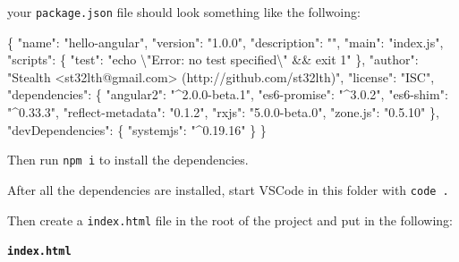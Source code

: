 \documentclass[12pt,]{article}
\newenvironment{Shaded}{}{}
\newcommand{\DataTypeTok}[1]{{#1}}
\newcommand{\CharTok}[1]{\textcolor[rgb]{0.00,0.50,0.50}{{#1}}}
\newcommand{\StringTok}[1]{\textcolor[rgb]{0.00,0.50,0.50}{{#1}}}
\newcommand{\FunctionTok}[1]{{#1}}
\begin{document}
your \texttt{package.json} file should look something like the
follwoing:

\begin{Shaded}
\begin{Highlighting}[numbers=left,,]
\FunctionTok{\{}
  \DataTypeTok{"name"}\FunctionTok{:} \StringTok{"hello-angular"}\FunctionTok{,}
  \DataTypeTok{"version"}\FunctionTok{:} \StringTok{"1.0.0"}\FunctionTok{,}
  \DataTypeTok{"description"}\FunctionTok{:} \StringTok{""}\FunctionTok{,}
  \DataTypeTok{"main"}\FunctionTok{:} \StringTok{"index.js"}\FunctionTok{,}
  \DataTypeTok{"scripts"}\FunctionTok{:} \FunctionTok{\{}
    \DataTypeTok{"test"}\FunctionTok{:} \StringTok{"echo }\CharTok{\textbackslash{}"}\StringTok{Error: no test specified}\CharTok{\textbackslash{}"}\StringTok{ && exit 1"}
  \FunctionTok{\},}
  \DataTypeTok{"author"}\FunctionTok{:} \StringTok{"Stealth <st32lth@gmail.com> (http://github.com/st32lth)"}\FunctionTok{,}
  \DataTypeTok{"license"}\FunctionTok{:} \StringTok{"ISC"}\FunctionTok{,}
  \DataTypeTok{"dependencies"}\FunctionTok{:} \FunctionTok{\{}
    \DataTypeTok{"angular2"}\FunctionTok{:} \StringTok{"^2.0.0-beta.1"}\FunctionTok{,}
    \DataTypeTok{"es6-promise"}\FunctionTok{:} \StringTok{"^3.0.2"}\FunctionTok{,}
    \DataTypeTok{"es6-shim"}\FunctionTok{:} \StringTok{"^0.33.3"}\FunctionTok{,}
    \DataTypeTok{"reflect-metadata"}\FunctionTok{:} \StringTok{"0.1.2"}\FunctionTok{,}
    \DataTypeTok{"rxjs"}\FunctionTok{:} \StringTok{"5.0.0-beta.0"}\FunctionTok{,}
    \DataTypeTok{"zone.js"}\FunctionTok{:} \StringTok{"0.5.10"}
  \FunctionTok{\},}
  \DataTypeTok{"devDependencies"}\FunctionTok{:} \FunctionTok{\{}
    \DataTypeTok{"systemjs"}\FunctionTok{:} \StringTok{"^0.19.16"}
  \FunctionTok{\}}
\FunctionTok{\}}
\end{Highlighting}
\end{Shaded}

Then run \texttt{npm\ i} to install the dependencies.

After all the dependencies are installed, start VSCode in this folder
with \texttt{code\ .}

Then create a \texttt{index.html} file in the root of the project and
put in the following:

\textbf{\texttt{index.html}}
\end{document}
